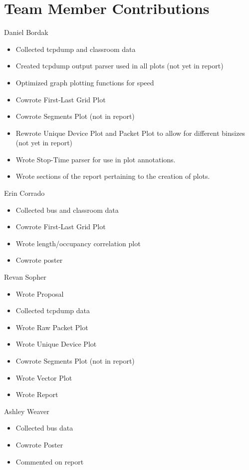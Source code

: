 \documentclass[letterpaper,abstract=on,titlepage=false]{scrreprt}
\begin{document}
\chapter*{Team Member Contributions}
Daniel Bordak
\begin{itemize}
  \item Collected tcpdump and classroom data
  \item Created tcpdump output parser used in all plots (not yet in report)
  \item Optimized graph plotting functions for speed
  \item Cowrote First-Last Grid Plot
  \item Cowrote Segments Plot (not in report)
  \item Rewrote Unique Device Plot and Packet Plot to allow for different binsizes (not yet in report)
  \item Wrote Stop-Time parser for use in plot annotations.
  \item Wrote sections of the report pertaining to the creation of plots.
\end{itemize}
Erin Corrado
\begin{itemize}
  \item Collected bus and classroom data
  \item Cowrote First-Last Grid Plot
  \item Wrote length/occupancy correlation plot
  \item Cowrote poster
\end{itemize}
Revan Sopher
\begin{itemize}
  \item Wrote Proposal
  \item Collected tcpdump data
  \item Wrote Raw Packet Plot
  \item Wrote Unique Device Plot
  \item Cowrote Segments Plot (not in report)
  \item Wrote Vector Plot
  \item Wrote Report
\end{itemize}
Ashley Weaver
\begin{itemize}
  \item Collected bus data
  \item Cowrote Poster
  \item Commented on report
\end{itemize}
\end{document}
